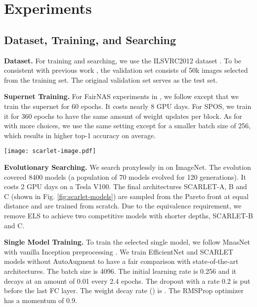 \documentclass[runningheads]{llncs}
\begin{document}
\section{Experiments}
\subsection{Dataset, Training, and Searching}
\textbf{Dataset.} For training and searching, we use the ILSVRC2012 dataset \cite{deng2009imagenet}. To be consistent with previous work \cite{tan2018mnasnet}, the validation set consists of 50k images selected from the training set. The original validation set serves as the test set. 

\textbf{Supernet Training.} For FairNAS experiments in , we follow \cite{chu2019fairnas} except that we train the supernet for 60 epochs. It costs nearly 8 GPU days. For SPOS, we train it for 360 epochs to have the same amount of weight updates per block. As for  with more choices, we use the same setting except for a smaller batch size of 256, which results in higher top-1 accuracy on average. 


\begin{figure*}[ht]
	\centering
	\texttt{[image: scarlet-image.pdf]}
\caption{The architectures of SCARLET-A, B and C (from top to bottom). Downsampling points are indicated by dashed lines. The stem and tail parts are omitted for brevity.}
	\label{fig:scarlet-models}
\end{figure*}

\textbf{Evolutionary Searching.} We search proxylessly in  on ImageNet. The evolution covered 8400 models (a population of 70 models evolved for 120 generations). It costs 2 GPU days on a Tesla V100. The final architectures SCARLET-A, B and C (shown in Fig. \ref{fig:scarlet-models}) are sampled from the Pareto front at equal distance and are trained from scratch. Due to the equivalence requirement, we remove ELS to achieve two competitive models with shorter depths, SCARLET-B and C. 

\textbf{Single Model Training.} To train the selected single model,  we follow MnasNet \cite{tan2018mnasnet} with vanilla Inception preprocessing \cite{szegedy2017inception}. We train EfficientNet and SCARLET models without AutoAugment \cite{cubuk2018autoaugment} to have a fair comparison with state-of-the-art architectures. The batch size is 4096. The initial learning rate is 0.256 and it decays at an amount of 0.01 every 2.4 epochs. The dropout with a rate 0.2 \cite{srivastava2014dropout} is put before the last FC layer. The weight decay rate () is . The RMSProp optimizer has a momentum of 0.9.
\end{document}
